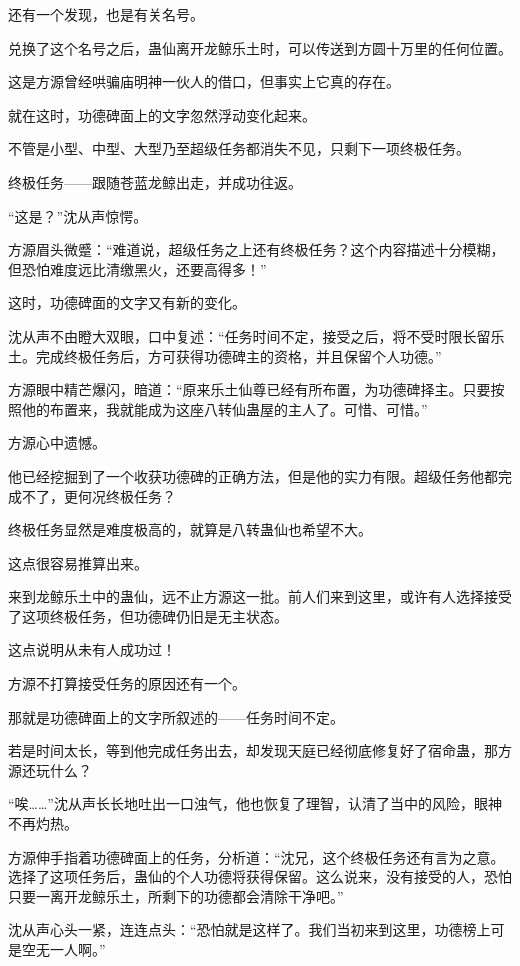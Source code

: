 \begin{this_body}
还有一个发现，也是有关名号。

兑换了这个名号之后，蛊仙离开龙鲸乐土时，可以传送到方圆十万里的任何位置。

这是方源曾经哄骗庙明神一伙人的借口，但事实上它真的存在。

就在这时，功德碑面上的文字忽然浮动变化起来。

不管是小型、中型、大型乃至超级任务都消失不见，只剩下一项终极任务。

终极任务——跟随苍蓝龙鲸出走，并成功往返。

“这是？”沈从声惊愕。

方源眉头微蹙：“难道说，超级任务之上还有终极任务？这个内容描述十分模糊，但恐怕难度远比清缴黑火，还要高得多！”

这时，功德碑面的文字又有新的变化。

沈从声不由瞪大双眼，口中复述：“任务时间不定，接受之后，将不受时限长留乐土。完成终极任务后，方可获得功德碑主的资格，并且保留个人功德。”

方源眼中精芒爆闪，暗道：“原来乐土仙尊已经有所布置，为功德碑择主。只要按照他的布置来，我就能成为这座八转仙蛊屋的主人了。可惜、可惜。”

方源心中遗憾。

他已经挖掘到了一个收获功德碑的正确方法，但是他的实力有限。超级任务他都完成不了，更何况终极任务？

终极任务显然是难度极高的，就算是八转蛊仙也希望不大。

这点很容易推算出来。

来到龙鲸乐土中的蛊仙，远不止方源这一批。前人们来到这里，或许有人选择接受了这项终极任务，但功德碑仍旧是无主状态。

这点说明从未有人成功过！

方源不打算接受任务的原因还有一个。

那就是功德碑面上的文字所叙述的——任务时间不定。

若是时间太长，等到他完成任务出去，却发现天庭已经彻底修复好了宿命蛊，那方源还玩什么？

“唉……”沈从声长长地吐出一口浊气，他也恢复了理智，认清了当中的风险，眼神不再灼热。

方源伸手指着功德碑面上的任务，分析道：“沈兄，这个终极任务还有言为之意。选择了这项任务后，蛊仙的个人功德将获得保留。这么说来，没有接受的人，恐怕只要一离开龙鲸乐土，所剩下的功德都会清除干净吧。”

沈从声心头一紧，连连点头：“恐怕就是这样了。我们当初来到这里，功德榜上可是空无一人啊。”


\end{this_body}

